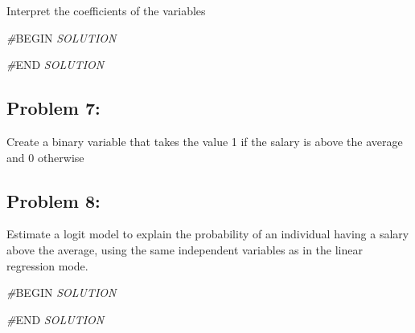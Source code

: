 \documentclass[
]{article}
\newenvironment{Shaded}{\begin{snugshade}}{\end{snugshade}}
\newcommand{\AttributeTok}[1]{\textcolor[rgb]{0.13,0.29,0.53}{#1}}
\newcommand{\CommentTok}[1]{\textcolor[rgb]{0.56,0.35,0.01}{\textit{#1}}}
\newcommand{\DecValTok}[1]{\textcolor[rgb]{0.00,0.00,0.81}{#1}}
\newcommand{\FunctionTok}[1]{\textcolor[rgb]{0.13,0.29,0.53}{\textbf{#1}}}
\newcommand{\NormalTok}[1]{#1}
\newcommand{\OtherTok}[1]{\textcolor[rgb]{0.56,0.35,0.01}{#1}}
\newcommand{\RegionMarkerTok}[1]{#1}
\newcommand{\SpecialCharTok}[1]{\textcolor[rgb]{0.81,0.36,0.00}{\textbf{#1}}}
\begin{document}
Interpret the coefficients of the variables

\begin{Shaded}
\begin{Highlighting}[]
\CommentTok{\#}\RegionMarkerTok{BEGIN}\CommentTok{ SOLUTION}

\CommentTok{\#}\RegionMarkerTok{END}\CommentTok{ SOLUTION}
\end{Highlighting}
\end{Shaded}

\hypertarget{problem-7}{%
\subsection{Problem 7:}\label{problem-7}}

Create a binary variable that takes the value 1 if the salary is above
the average and 0 otherwise

\begin{Shaded}
\end{Shaded}

\hypertarget{problem-8}{%
\subsection{Problem 8:}\label{problem-8}}

Estimate a logit model to explain the probability of an individual
having a salary above the average, using the same independent variables
as in the linear regression mode.

\begin{Shaded}
\begin{Highlighting}[]
\CommentTok{\#}\RegionMarkerTok{BEGIN}\CommentTok{ SOLUTION}

\CommentTok{\#}\RegionMarkerTok{END}\CommentTok{ SOLUTION}
\end{Highlighting}
\end{Shaded}
\end{document}
